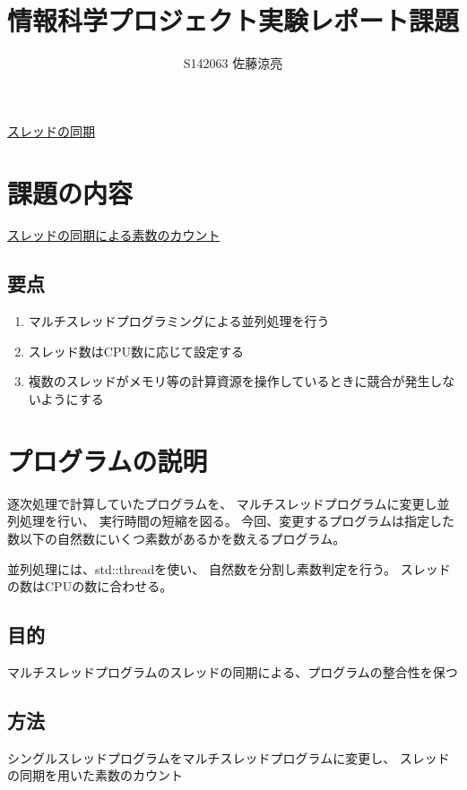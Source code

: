 \documentclass[a4j]{jarticle}
\title{情報科学プロジェクト実験レポート課題}
\author{S142063 佐藤涼亮}
\begin{document}
\maketitle
\centerline{\LARGE \underline{スレッドの同期}}
\section{課題の内容}
{\large \underline{スレッドの同期による素数のカウント}}
\subsection{要点}
\begin{enumerate}
\item マルチスレッドプログラミングによる並列処理を行う
\item スレッド数はCPU数に応じて設定する
\item 複数のスレッドがメモリ等の計算資源を操作しているときに競合が発生しないようにする
\end{enumerate}
\section{プログラムの説明}
逐次処理で計算していたプログラムを、
マルチスレッドプログラムに変更し並列処理を行い、
実行時間の短縮を図る。
今回、変更するプログラムは指定した数以下の自然数にいくつ素数があるかを数えるプログラム。

並列処理には、std::threadを使い、
自然数を分割し素数判定を行う。
スレッドの数はCPUの数に合わせる。

\subsection{目的}
マルチスレッドプログラムのスレッドの同期による、プログラムの整合性を保つ

\subsection{方法}
シングルスレッドプログラムをマルチスレッドプログラムに変更し、
スレッドの同期を用いた素数のカウント
\end{document}

